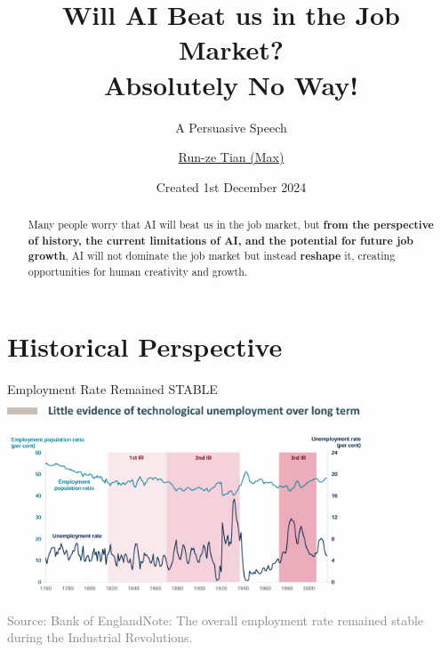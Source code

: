 \documentclass{beamer}
\title{Will AI Beat us in the Job Market?\\Absolutely No Way!}
\subtitle{A Persuasive Speech}
\author{\href{mailto:trunzer@ruc.edu.cn}{Run-ze Tian (Max)}}
\date{Created 1st December 2024}
\begin{document}
    \maketitle

    \begin{frame}
        \begin{abstract}
            \qquad Many people worry that AI will beat us in the job market, but \textbf{\textcolor{structure}{ from 
                        the perspective of history, the current limitations of AI, and the
                        potential for future job growth}}, AI will not dominate the job market
                        but instead \textbf{\textcolor{structure}{\large reshape}} it, creating opportunities for human creativity
                        and growth.
        \end{abstract}
    \end{frame}

    \section{Historical Perspective}

    \begin{frame}{Employment Rate Remained STABLE}{\thesection \, \secname}
        \includegraphics[width=0.8\textwidth]{失业率.png}

        \renewcommand{\footnoterule}
        \footnotetext{\textcolor{gray}{\tiny Source: Bank of England\qquad Note: The overall employment rate remained stable during the Industrial Revolutions.}}
    \end{frame}
\end{document}
